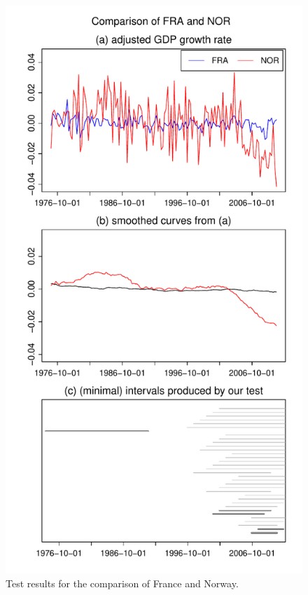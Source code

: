 \documentclass[a4paper,12pt]{article}
\begin{document}
\begin{figure}[t!]
\begin{minipage}[t]{0.49\textwidth}
\includegraphics[width=\textwidth]{Plots/gdp/FRA_vs_NOR}
\caption{Test results for the comparison of France and Norway.}\label{fig:France:Norway}
\end{minipage}
\hspace{0.25cm}

\end{figure}
\end{document}
